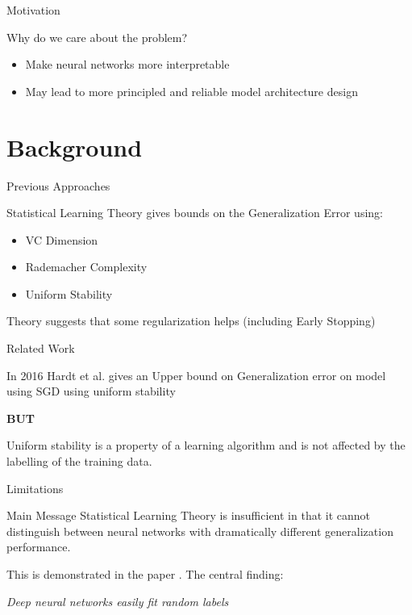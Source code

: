 \documentclass[10pt]{beamer}
\begin{document}
\begin{frame}{Motivation}
\begin{center}
	Why do we care about the problem?
\end{center}
\begin{itemize}
	\item Make neural networks more interpretable
	\item May lead to more principled and reliable model architecture design
\end{itemize}


\end{frame}	

\section{Background}

\begin{frame}{Previous Approaches}
	
Statistical Learning Theory gives bounds on the Generalization Error using:
\begin{itemize}
	\item VC Dimension 
	\item Rademacher Complexity
	\item Uniform Stability
\end{itemize}
Theory suggests that some regularization helps (including Early Stopping)
\end{frame}	

\begin{frame}{Related Work}

In 2016 Hardt et al. gives an Upper bound on Generalization error on model using SGD using uniform stability \cite{DBLP:journals/corr/HardtRS15}

\textbf{BUT}

Uniform stability is a property of a learning algorithm and is not affected by the labelling of the training data.

\end{frame}

\begin{frame}{Limitations}
\begin{alertblock}{Main Message}
	Statistical Learning Theory is insufficient in that it cannot distinguish between neural networks with dramatically different generalization performance.
\end{alertblock}

This is demonstrated in the paper \cite{DBLP:journals/corr/ZhangBHRV16}. The central finding:

\begin{center}
	\emph{Deep neural networks easily fit random labels}
\end{center}

\end{frame}	
\end{document}
